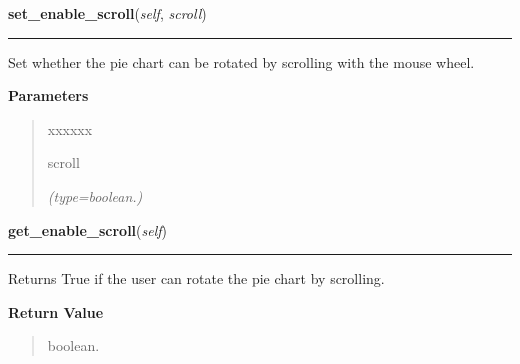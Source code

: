     \label{pygtk_chart:pie_chart:PieChart:set_enable_scroll}

    \vspace{0.5ex}

\hspace{.8\funcindent}\begin{boxedminipage}{\funcwidth}

    \raggedright \textbf{set\_enable\_scroll}(\textit{self}, \textit{scroll})

    \vspace{-1.5ex}

    \rule{\textwidth}{0.5\fboxrule}
\setlength{\parskip}{2ex}
    Set whether the pie chart can be rotated by scrolling with the mouse 
    wheel.

\setlength{\parskip}{1ex}
      \textbf{Parameters}
      \vspace{-1ex}

      \begin{quote}
        \begin{Ventry}{xxxxxx}

          \item[scroll]

            {\it (type=boolean.)}

        \end{Ventry}

      \end{quote}

    \end{boxedminipage}

    \label{pygtk_chart:pie_chart:PieChart:get_enable_scroll}

    \vspace{0.5ex}

\hspace{.8\funcindent}\begin{boxedminipage}{\funcwidth}

    \raggedright \textbf{get\_enable\_scroll}(\textit{self})

    \vspace{-1.5ex}

    \rule{\textwidth}{0.5\fboxrule}
\setlength{\parskip}{2ex}
    Returns True if the user can rotate the pie chart by scrolling.

\setlength{\parskip}{1ex}
      \textbf{Return Value}
    \vspace{-1ex}

      \begin{quote}
      boolean.

      \end{quote}

    \end{boxedminipage}

